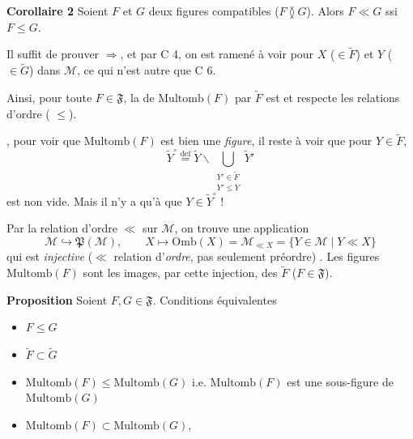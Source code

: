 \documentclass[11pt,a4paper]{article}
\begin{document}
\textbf{Corollaire 2} Soient $F$ et $G$ deux figures compatibles ($F \between G$). Alors $F \ll G$ ssi $F \leq G$.

Il suffit de prouver $\Longrightarrow$, et par C 4, on est ramené à   voir pour $X$ ($\in \widetilde{F}$) et $Y$ ($\in \widetilde{G}$) dans $\mathcal{M}$, ce qui n'est autre que C 6.

Ainsi, pour toute $F \in \mathfrak{F}$, la  de $\mathrm{Multomb}(F)$ par $\widetilde{F}$ est  \ill{} et respecte les relations d'ordre \ill{} (\ill{} $\leq$).

, pour voir que $\mathrm{Multomb}(F)$ est bien une \emph{figure}, il reste à voir que pour $Y \in \widetilde{F}$,
\[
  \widetilde{Y}^{\circ} \overset{\mathrm{def}}{=} \widetilde{Y} \smallsetminus \bigcup_{\substack{Y' \in \widetilde{F} \\ Y' \leq Y}} \widetilde{Y}'
\]
est non vide. Mais il n'y a qu'à   que $Y \in \widetilde{Y}^{\circ}$ !


Par la relation d'ordre $\ll$ sur $\mathcal{M}$, on trouve une application
\[
  \mathcal{M} \hookrightarrow \mathfrak{P}(\mathcal{M}), \qquad X \longmapsto \mathrm{Omb}(X) = \mathcal{M}_{\ll X} = \lbrace Y \in \mathcal{M} \mid Y \ll X \rbrace \tag{1.39}
\]
qui est \emph{injective} ($\ll$ relation d'\emph{ordre}, pas seulement préordre) . Les figures \struck{\ill{}} $\mathrm{Multomb}(F)$ sont les images, par cette injection, des $\widetilde{F}$ ($F \in \mathfrak{F}$). \struck{\ill{}}

\textbf{Proposition} Soient $F, G \in \mathfrak{F}$. Conditions équivalentes
\begin{itemize}
  \item[(i)] $F \leq G$
  \item[(i bis)] $\widetilde{F} \subset \widetilde{G}$
  \item[(ii)] $\mathrm{Multomb}(F) \leq \mathrm{Multomb}(G)$ i.e. $\mathrm{Multomb}(F)$ est une sous-figure de $\mathrm{Multomb}(G)$
  \item[(ii bis)] $\mathrm{Multomb}(F) \subset \mathrm{Multomb}(G)$,
\end{itemize}
\end{document}
